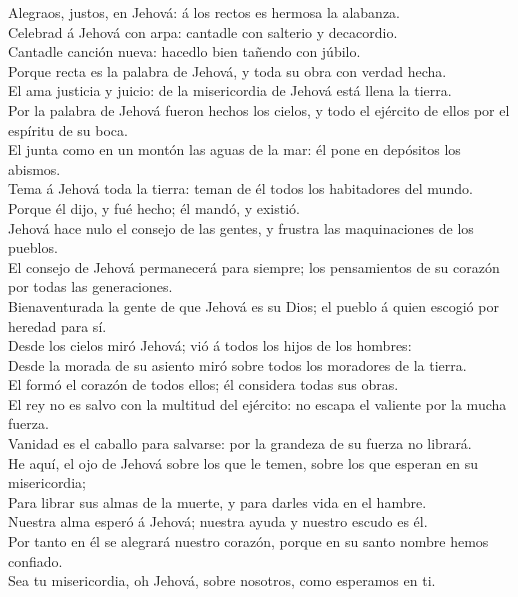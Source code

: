  Alegraos, justos, en Jehová: á los rectos es hermosa la
alabanza.\\
 Celebrad á Jehová con arpa: cantadle con salterio y
decacordio.\\
 Cantadle canción nueva: hacedlo bien tañendo con júbilo.\\
 Porque recta es la palabra de Jehová, y toda su obra con
verdad hecha.\\
 El ama justicia y juicio: de la misericordia de Jehová está
llena la tierra.\\
 Por la palabra de Jehová fueron hechos los cielos, y todo
el ejército de ellos por el espíritu de su boca.\\
 El junta como en un montón las aguas de la mar: él pone en
depósitos los abismos.\\
 Tema á Jehová toda la tierra: teman de él todos los
habitadores del mundo.\\
 Porque él dijo, y fué hecho; él mandó, y existió.\\
 Jehová hace nulo el consejo de las gentes, y frustra las
maquinaciones de los pueblos.\\
 El consejo de Jehová permanecerá para siempre; los
pensamientos de su corazón por todas las generaciones.\\
 Bienaventurada la gente de que Jehová es su Dios; el
pueblo á quien escogió por heredad para sí.\\
 Desde los cielos miró Jehová; vió á todos los hijos de los
hombres:\\
 Desde la morada de su asiento miró sobre todos los
moradores de la tierra.\\
 El formó el corazón de todos ellos; él considera todas sus
obras.\\
 El rey no es salvo con la multitud del ejército: no escapa
el valiente por la mucha fuerza.\\
 Vanidad es el caballo para salvarse: por la grandeza de su
fuerza no librará.\\
 He aquí, el ojo de Jehová sobre los que le temen, sobre
los que esperan en su misericordia;\\
 Para librar sus almas de la muerte, y para darles vida en
el hambre.\\
 Nuestra alma esperó á Jehová; nuestra ayuda y nuestro
escudo es él.\\
 Por tanto en él se alegrará nuestro corazón, porque en su
santo nombre hemos confiado.\\
 Sea tu misericordia, oh Jehová, sobre nosotros, como
esperamos en ti.

